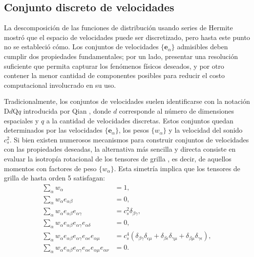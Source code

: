 \subsection{Conjunto discreto de velocidades}
La descomposici\'on de las funciones de distribuci\'on usando series de Hermite mostr\'o que el espacio de velocidades puede ser discretizado, pero hasta este punto no se estableci\'o c\'omo. Los conjuntos de velocidades $\{\bm{e}_{\alpha}\}$ admisibles deben cumplir dos propiedades fundamentales; por un lado, presentar una resoluci\'on suficiente que permita capturar los fen\'omenos f\'isicos deseados, y por otro contener la menor cantidad de componentes posibles para reducir el costo computacional involucrado en su uso.
\par 
Tradicionalmente, los conjuntos de velocidades suelen identificarse con la notaci\'on D$d$Q$q$ introducida por Qian \cite{qian_lattice_1992}, donde $d$ corresponde al n\'umero de dimensiones espaciales y $q$ a la cantidad de velocidades discretas. Estos conjuntos quedan determinados por las velocidades $\{\bm{e}_{\alpha}\}$, los pesos $\{w_{\alpha}\}$ y la velocidad del sonido $c_s^2$. Si bien existen numerosos mecanismos para construir conjuntos de velocidades con las propiedades deseadas, la alternativa m\'as sencilla y directa consiste en evaluar la isotrop\'ia rotacional de los tensores de grilla \cite{guo_lattice_2013,frisch_lattice_1987}, es decir, de aquellos momentos con factores de peso $\{w_{\alpha}\}$. Esta simetr\'ia implica que los tensores de grilla de hasta orden 5 satisfagan:
\begin{subequations}
	\begin{align}
	\sum_{\alpha} w_{\alpha} &= 1, \\
	\sum_{\alpha} w_{\alpha} e_{\alpha\beta} &= 0, \\
	\sum_{\alpha} w_{\alpha} e_{\alpha\beta} e_{{\alpha}\gamma} &= c_s^2 \delta_{\beta\gamma} ,\\
	\sum_{\alpha} w_{\alpha} e_{\alpha\beta} e_{{\alpha}\gamma} e_{{\alpha}\delta} &= 0, \\
	\sum_{\alpha} w_{\alpha} e_{\alpha\beta} e_{{\alpha}\gamma} e_{{\alpha}\epsilon} e_{{\alpha}\mu} &= c_s^4(\delta_{\beta\gamma}\delta_{\epsilon\mu} + \delta_{\beta\epsilon}\delta_{\gamma\mu} + \delta_{\beta\mu}\delta_{\gamma\epsilon}), \\
	\sum_{\alpha} w_{\alpha} e_{\alpha\beta} e_{{\alpha}\gamma} e_{{\alpha}\epsilon} e_{{\alpha}\mu} e_{{\alpha}\nu} &= 0.
	\end{align}
	\label{eq:tensores_grilla}	
\end{subequations}

